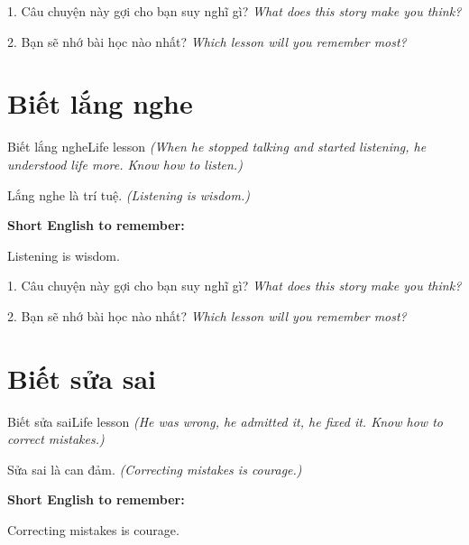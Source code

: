 \begin{tuhocnhanh}
1. Câu chuyện này gợi cho bạn suy nghĩ gì? \textit{What does this story make you think?}

2. Bạn sẽ nhớ bài học nào nhất? \textit{Which lesson will you remember most?}
\end{tuhocnhanh}
\ngancach


\section{Biết lắng nghe}
\begin{truyen}{Biết lắng nghe}{Life lesson}
\textit{(When he stopped talking and started listening, he understood life more. Know how to listen.)}
\end{truyen}

\begin{baihoc}
Lắng nghe là trí tuệ.
\textit{(Listening is wisdom.)}
\end{baihoc}

\begin{ghinhoanh}
\textbf{Short English to remember:}

Listening is wisdom.

\end{ghinhoanh}

\begin{tuhocnhanh}
1. Câu chuyện này gợi cho bạn suy nghĩ gì? \textit{What does this story make you think?}

2. Bạn sẽ nhớ bài học nào nhất? \textit{Which lesson will you remember most?}
\end{tuhocnhanh}
\ngancach


\section{Biết sửa sai}
\begin{truyen}{Biết sửa sai}{Life lesson}
\textit{(He was wrong, he admitted it, he fixed it. Know how to correct mistakes.)}
\end{truyen}

\begin{baihoc}
Sửa sai là can đảm.
\textit{(Correcting mistakes is courage.)}
\end{baihoc}

\begin{ghinhoanh}
\textbf{Short English to remember:}

Correcting mistakes is courage.

\end{ghinhoanh}

